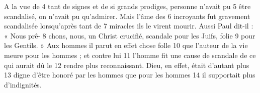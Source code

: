 A la vue de	 
4	 	tant de signes et de si grands prodiges, personne n'avait pu	 
5	 	être scandalisé, on n'avait pu qu'admirer. Mais l'âme des	 
6	 	incroyants fut gravement scandalisée lorsqu'après tant de	 
7	 	miracles ils le virent mourir. Aussi Paul dit-il : « Nous prê-	 
8	 	chons, nous, un Christ crucifié, scandale pour les Juifs, folie	 
9	 	pour les Gentils. » Aux hommes il parut en effet chose folle	 
10	 	que l'auteur de la vie meure pour les hommes ; et contre lui	 
11	 	l'homme fit une cause de scandale de ce qui aurait dû le	 
12	 	rendre plus reconnaissant. Dieu, en effet, était d'autant plus	 
13	 	digne d'être honoré par les hommes que pour les hommes	 
14	 	il supportait plus d'indignités.